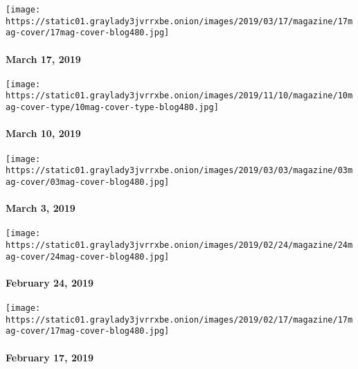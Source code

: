 \texttt{[image: https://static01.graylady3jvrrxbe.onion/images/2019/03/17/magazine/17mag-cover/17mag-cover-blog480.jpg]}

\hypertarget{march-17-2019}{%
\paragraph{March 17, 2019}\label{march-17-2019}}

\href{https://www.nytimes3xbfgragh.onion/interactive/2019/03/07/magazine/top-songs.html}{}

\texttt{[image: https://static01.graylady3jvrrxbe.onion/images/2019/11/10/magazine/10mag-cover-type/10mag-cover-type-blog480.jpg]}

\hypertarget{march-10-2019}{%
\paragraph{March 10, 2019}\label{march-10-2019}}

\href{https://www.nytimes3xbfgragh.onion/issue/magazine/2019/03/01/the-322019-issue}{}

\texttt{[image: https://static01.graylady3jvrrxbe.onion/images/2019/03/03/magazine/03mag-cover/03mag-cover-blog480.jpg]}

\hypertarget{march-3-2019}{%
\paragraph{March 3, 2019}\label{march-3-2019}}

\href{https://www.nytimes3xbfgragh.onion/issue/magazine/2019/02/22/the-24219-issue}{}

\texttt{[image: https://static01.graylady3jvrrxbe.onion/images/2019/02/24/magazine/24mag-cover/24mag-cover-blog480.jpg]}

\hypertarget{february-24-2019}{%
\paragraph{February 24, 2019}\label{february-24-2019}}

\href{https://www.nytimes3xbfgragh.onion/issue/magazine/2019/02/19/the-21719-issue}{}

\texttt{[image: https://static01.graylady3jvrrxbe.onion/images/2019/02/17/magazine/17mag-cover/17mag-cover-blog480.jpg]}

\hypertarget{february-17-2019}{%
\paragraph{February 17, 2019}\label{february-17-2019}}

